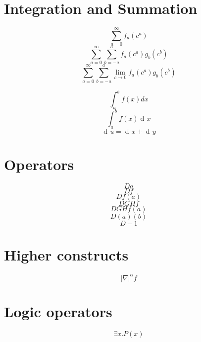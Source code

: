 \documentclass{article}
\DeclareMathOperator{\diffd}{\operatorname{d}\!}
\begin{document}
\section{Integration and Summation}
\[ \sum_{a=0}^\infty f_a(c^a) \]
\[ \sum_{a=0}^\infty \sum_{b=-a}^a f_a(c^a) g_b(c^b) \]
\[ \sum_{a=0}^\infty \sum_{b=-a}^a \lim_{c\rightarrow 0} f_a(c^a) g_b(c^b) \]

\[ \int_a^b f(x) dx \]
\[ \int_a^b f(x) \diffd x \]
\[ \diffd u = \diffd x + \diffd y \]

\section{Operators}
\[  D a \]
\[  D f \]
\[  D f(a) \]
\[  D G H f \]
\[  D G H f (a) \]
\[  D (a) (b) \]
\[ D -1 \]

\section{Higher constructs}
\[ |\nabla|^{\alpha} f \]

\section{Logic operators}
\[ \exists x . P(x) \]
\end{document}

